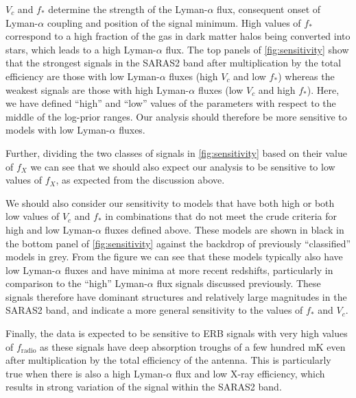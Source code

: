 $V_c$ and $f_*$ determine the strength of the Lyman-$\alpha$ flux, consequent onset of Lyman-$\alpha$ coupling and position of the signal minimum. High values of $f_*$ correspond to a high fraction of the gas in dark matter halos being converted into stars, which leads to a high Lyman-$\alpha$ flux. The top panels of \cref{fig:sensitivity} show that the strongest signals in the SARAS2 band after multiplication by the total efficiency are those with low Lyman-$\alpha$ fluxes (high $V_c$ and low $f_*$) whereas the weakest signals are those with high Lyman-$\alpha$ fluxes (low $V_c$ and high $f_*$). Here, we have defined ``high'' and ``low'' values of the parameters with respect to the middle of the log-prior ranges. Our analysis should therefore be more sensitive to models with low Lyman-$\alpha$ fluxes.

Further, dividing the two classes of signals in \cref{fig:sensitivity} based on their value of $f_X$ we can see that we should also expect our analysis to be sensitive to low values of $f_X$, as expected from the discussion above.

We should also consider our sensitivity to models that have both high or both low values of $V_c$ and $f_*$ in combinations that do not meet the crude criteria for high and low Lyman-$\alpha$ fluxes defined above. These models are shown in black in the bottom panel of \cref{fig:sensitivity} against the backdrop of previously ``classified'' models in grey. From the figure we can see that these models typically also have low Lyman-$\alpha$ fluxes and have minima at more recent redshifts, particularly in comparison to the ``high'' Lyman-$\alpha$ flux signals discussed previously. These signals therefore have dominant structures and relatively large magnitudes in the SARAS2 band, and indicate a more general sensitivity to the values of $f_*$ and $V_c$.

Finally, the data is expected to be sensitive to ERB signals with very high values of $f_\mathrm{radio}$ as these signals have deep absorption troughs of a few hundred mK even after multiplication by the total efficiency of the antenna. This is particularly true when there is also a high Lyman-$\alpha$ flux and low X-ray efficiency, which results in strong variation of the signal within the SARAS2 band.

